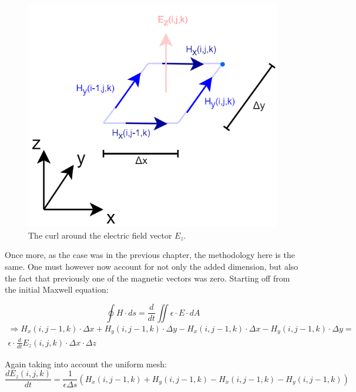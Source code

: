 \begin{figure}[h!]
	\centering
	\includegraphics[scale=0.5]{Figures/fdtd3dEzCurl}
	\decoRule
	\caption[3D $E_z$ vector curl]{The curl around the electric field vector $E_z$.}
	\label{fig:fdtd3dEzCurl}
\end{figure}

Once more, as the case was in the previous chapter, the methodology here is the same. One must however now account for not only the added dimension, but also the fact that previously one of the magnetic vectors was zero.
Starting off from the initial Maxwell equation:

\begin{equation}
	\label{eqn:magneticIntegral}
	\oint H \cdot ds = \frac{d}{dt} \iint \epsilon \cdot E \cdot dA
\end{equation}
\begin{multline}
	\label{eqn:3dEzCurl1}
	\Rightarrow H_x(i,j-1,k) \cdot \Delta x + H_y(i,j-1,k) \cdot \Delta y - H_x(i,j-1,k) \cdot \Delta x - H_y(i,j-1,k) \cdot \Delta y =\\ \epsilon \cdot \frac{d}{dt} E_z(i,j,k) \cdot \Delta x \cdot \Delta z
\end{multline}

Again taking into account the uniform mesh:
\begin{equation}
	\label{eqn:3dEzCurl2}
	\frac{d E_z(i,j,k)}{dt} = \frac{1}{\epsilon \Delta s} (H_x(i,j-1,k) + H_y(i,j-1,k) - H_x(i,j-1,k) - H_y(i,j-1,k))
\end{equation}

